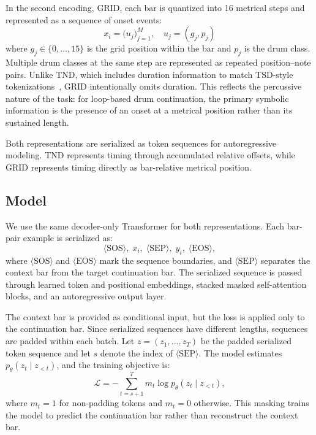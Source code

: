 \documentclass{article}
\begin{document}
In the second encoding, GRID, each bar is quantized into 16 metrical steps and represented as a sequence of onset events:
\begin{equation}
x_i = \bigl(u_j\bigr)_{j=1}^{M}, \quad u_j = (g_j, p_j)
\end{equation}
where $g_j\in\{0,\dots,15\}$ is the grid position within the bar and $p_j$ is the drum class. Multiple drum classes at the same step are represented as repeated position--note pairs. Unlike TND, which includes duration information to match TSD-style tokenizations~\cite{fradet-etal-2023-byte}, GRID intentionally omits duration. This reflects the percussive nature of the task: for loop-based drum continuation, the primary symbolic information is the presence of an onset at a metrical position rather than its sustained length.

Both representations are serialized as token sequences for autoregressive modeling. TND represents timing through accumulated relative offsets, while GRID represents timing directly as bar-relative metrical position.



\subsection{Model}\label{subsec:model}

We use the same decoder-only Transformer \cite{VaswaniSPUJGKP17} for both representations. Each bar-pair example is serialized as:
\begin{equation}
\langle \mathrm{SOS} \rangle,\; x_i,\; \langle \mathrm{SEP} \rangle,\; y_i,\; \langle \mathrm{EOS} \rangle,
\end{equation}
where $\langle \mathrm{SOS} \rangle$ and $\langle \mathrm{EOS} \rangle$ mark the sequence boundaries, and $\langle \mathrm{SEP} \rangle$ separates the context bar from the target continuation bar. The serialized sequence is passed through learned token and positional embeddings, stacked masked self-attention blocks, and an autoregressive output layer.

The context bar is provided as conditional input, but the loss is applied only to the continuation bar. Since serialized sequences have different lengths, sequences are padded within each batch. Let $z=(z_1,\dots,z_T)$ be the padded serialized token sequence and let $s$ denote the index of $\langle \mathrm{SEP} \rangle$. The model estimates $p_\theta(z_t \mid z_{<t})$, and the training objective is:
\begin{equation}
\mathcal{L} = - \sum_{t=s+1}^{T} m_t \log p_\theta(z_t \mid z_{<t}),
\end{equation}
where $m_t=1$ for non-padding tokens and $m_t=0$ otherwise. This masking trains the model to predict the continuation bar rather than reconstruct the context bar.
\end{document}

